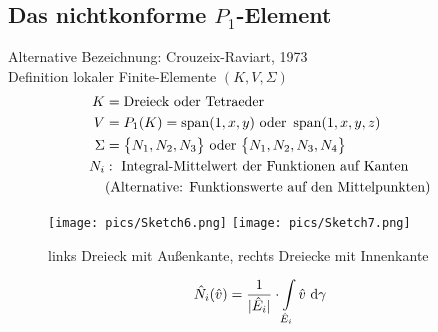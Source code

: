 \subsection{Das nichtkonforme \texorpdfstring{$P_1$}{P\_1}-Element}
Alternative Bezeichnung: Crouzeix-Raviart, 1973\\
Definition lokaler Finite-Elemente $(K,V,\Sigma)$
\begin{align*}
	K&=\text{Dreieck oder Tetraeder}\\
	V&=P_1(K)=\operatorname{span}(1,x,y)\text{ oder }\operatorname{span}(1,x,y,z)\\
	\Sigma&=\big\lbrace N_1,N_2,N_3\big\rbrace\text{ oder }\big\lbrace N_1,N_2,N_3,N_4\big\rbrace\\
	N_i&:\text{ Integral-Mittelwert der Funktionen auf Kanten}\\
	&\text{(Alternative: Funktionswerte auf den Mittelpunkten)}
\end{align*}

\begin{beisp}\enter
	\begin{figure}[!ht]
		\begin{center}
			\texttt{[image: pics/Sketch6.png]}
			\texttt{[image: pics/Sketch7.png]}
			\caption{links Dreieck mit Außenkante, rechts Dreiecke mit Innenkante}
			\label{AbbKantentypen}
		\end{center}
	\end{figure}
	\begin{align*}
		\hat{N}_i(\hat{v})=\frac{1}{|\hat{E}_i|}\cdot\int\limits_{\hat{E}_i}\hat{v}\text{ d}\gamma
	\end{align*}
\end{beisp}


